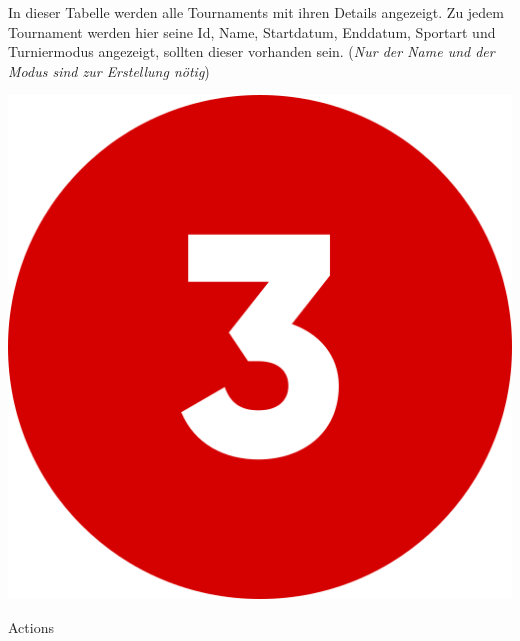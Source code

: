 In dieser Tabelle werden alle Tournaments mit ihren Details angezeigt. Zu jedem Tournament werden hier seine Id, Name, Startdatum, Enddatum, Sportart
und Turniermodus angezeigt, sollten dieser vorhanden sein. (\textit{Nur der Name und der Modus sind zur Erstellung nötig})


\bigskip
\includegraphics[scale=0.05]{pics/user-guide/numbers/number-3.png} \begin{LARGE} Actions \end{LARGE}

